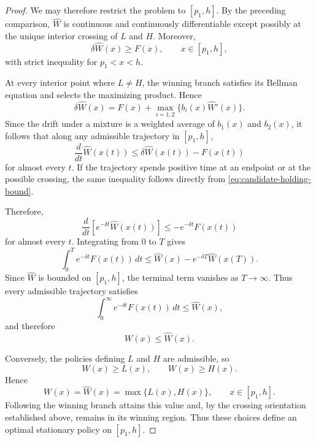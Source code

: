 \documentclass[11pt]{article}
\begin{document}
\begin{proof}
We may therefore restrict the problem to $[p_1,h]$. 
By the preceding comparison, $\widehat W$ is continuous and continuously differentiable except possibly at the unique interior crossing of $L$ and $H$. Moreover,
\begin{equation}\label{eq:candidate-holding-bound}
    \delta\widehat W(x)\geq F(x),
    \qquad x\in[p_1,h],
\end{equation}
with strict inequality for $p_1<x<h$.

At every interior point where $L\neq H$, the winning branch satisfies its Bellman equation and selects the maximizing product. Hence
\begin{equation*}
    \delta\widehat W(x)
    =
    F(x)+\max_{i=1,2}\{b_i(x)\widehat W'(x)\}.
\end{equation*}
Since the drift under a mixture is a weighted average of $b_1(x)$ and $b_2(x)$, it follows that along any admissible trajectory in $[p_1,h]$,
\begin{equation*}
    \frac{d}{dt}\widehat W(x(t))
    \leq
    \delta\widehat W(x(t))-F(x(t))
\end{equation*}
for almost every $t$. If the trajectory spends positive time at an endpoint or at the possible crossing, the same inequality follows directly from
\eqref{eq:candidate-holding-bound}.

Therefore,
\begin{equation*}
    \frac{d}{dt}
    \left[e^{-\delta t}\widehat W(x(t))\right]
    \leq
    -e^{-\delta t}F(x(t))
\end{equation*}
for almost every $t$. Integrating from $0$ to $T$ gives
\begin{equation*}
    \int_0^T e^{-\delta t}F(x(t))\,dt
    \leq
    \widehat W(x)-e^{-\delta T}\widehat W(x(T)).
\end{equation*}
Since $\widehat W$ is bounded on $[p_1,h]$, the terminal term vanishes as $T\to\infty$. Thus every admissible trajectory satisfies
\begin{equation*}
    \int_0^\infty e^{-\delta t}F(x(t))\,dt
    \leq
    \widehat W(x),
\end{equation*}
and therefore
\begin{equation*}
    W(x)\leq\widehat W(x).
\end{equation*}

Conversely, the policies defining $L$ and $H$ are admissible, so
\begin{equation*}
    W(x)\geq L(x),
    \qquad
    W(x)\geq H(x).
\end{equation*}
Hence
\begin{equation*}
    W(x)=\widehat W(x)=\max\{L(x),H(x)\},
    \qquad x\in[p_1,h].
\end{equation*}
Following the winning branch attains this value and, by the crossing orientation established above, remains in its winning region. Thus these choices define an optimal stationary policy on $[p_1,h]$.


\end{proof}
\end{document}
